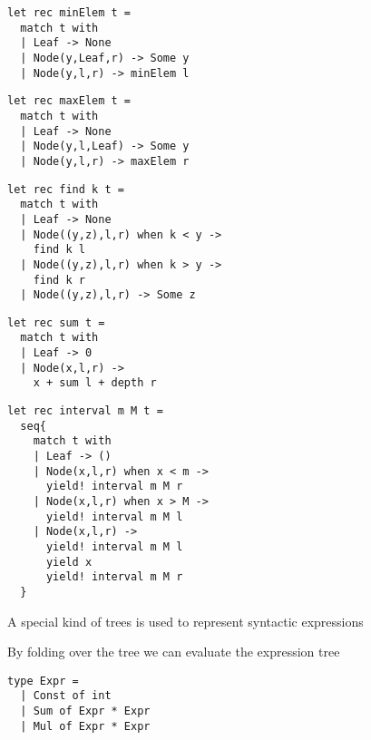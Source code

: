 \documentclass{beamer}
\begin{document}
\begin{frame}[fragile]
\begin{lstlisting}
let rec minElem t =
  match t with
  | Leaf -> None
  | Node(y,Leaf,r) -> Some y
  | Node(y,l,r) -> minElem l
\end{lstlisting}
\end{frame}

\begin{frame}[fragile]
\begin{lstlisting}
let rec maxElem t =
  match t with
  | Leaf -> None
  | Node(y,l,Leaf) -> Some y
  | Node(y,l,r) -> maxElem r
\end{lstlisting}
\end{frame}

\begin{frame}[fragile]
\begin{lstlisting}
let rec find k t =
  match t with
  | Leaf -> None
  | Node((y,z),l,r) when k < y ->
    find k l
  | Node((y,z),l,r) when k > y ->
    find k r
  | Node((y,z),l,r) -> Some z
\end{lstlisting}
\end{frame}

\begin{frame}[fragile]
\begin{lstlisting}
let rec sum t =
  match t with
  | Leaf -> 0
  | Node(x,l,r) ->
    x + sum l + depth r
\end{lstlisting}
\end{frame}

\begin{frame}[fragile]
\begin{lstlisting}
let rec interval m M t =
  seq{
    match t with
    | Leaf -> ()
    | Node(x,l,r) when x < m ->
      yield! interval m M r
    | Node(x,l,r) when x > M ->
      yield! interval m M l
    | Node(x,l,r) ->
      yield! interval m M l
      yield x
      yield! interval m M r
  }
\end{lstlisting}
\end{frame}

\begin{slide}{
\item A special kind of trees is used to represent syntactic expressions
\item By folding over the tree we can evaluate the expression tree
}\end{slide}

\begin{frame}[fragile]
\begin{lstlisting}
type Expr = 
  | Const of int
  | Sum of Expr * Expr
  | Mul of Expr * Expr
\end{lstlisting}
\end{frame}
\end{document}
